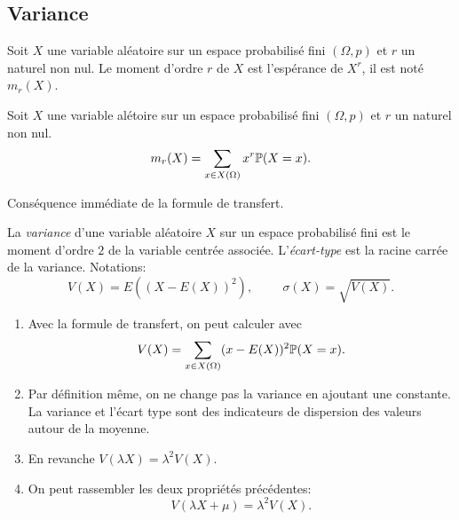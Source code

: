 \subsection{Variance}
\begin{defi}[moments]
 Soit $X$ une variable aléatoire sur un espace probabilisé fini $(\Omega,p)$ et $r$ un naturel non nul. Le moment d'ordre $r$ de $X$ est l'espérance de $X^r$, il est noté $m_r(X)$.
\end{defi}
\begin{prop}
 Soit $X$ une variable alétoire sur un espace probabilisé fini $(\Omega,p)$ et $r$ un naturel non nul.
\begin{displaymath}
 m_r(X)=\sum_{x\in X(\Omega)}x^r\mathbb{P}(X=x).
\end{displaymath}
\end{prop}
\begin{demo}
 Conséquence immédiate de la formule de transfert.
\end{demo}
\begin{defi}
 La \emph{variance} d'une variable aléatoire $X$ sur un espace probabilisé fini est le moment d'ordre $2$ de la variable centrée associée. L'\emph{écart-type} est la racine carrée de la variance. Notations:
\begin{displaymath}
 V(X) = E((X-E(X))^2),\hspace{1cm}\sigma(X)=\sqrt{V(X)}.
\end{displaymath}
\end{defi}
\begin{rems}
 \begin{enumerate}
  \item Avec la formule de transfert, on peut calculer avec
\begin{displaymath}
 V(X) = \sum_{x\in X(\Omega)}(x-E(X))^2\mathbb{P}(X=x).
\end{displaymath}

\item Par définition même, on ne change pas la variance en ajoutant une constante. La variance et l'écart type sont des indicateurs de dispersion des valeurs autour de la moyenne.
\item En revanche $V(\lambda X)=\lambda^2V(X)$.
\item On peut rassembler les deux propriétés précédentes:
\begin{displaymath}
 V(\lambda X +\mu) = \lambda^2 V(X).
\end{displaymath}
 \end{enumerate}
\end{rems}

